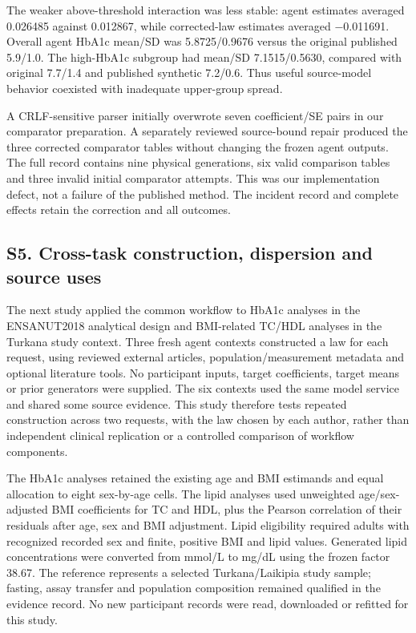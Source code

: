 \documentclass[10pt,twocolumn]{article}
\begin{document}
The weaker above-threshold interaction was less stable: agent estimates averaged 0.026485 against 0.012867, while corrected-law estimates averaged −0.011691. Overall agent HbA1c mean/SD was 5.8725/0.9676 versus the original published 5.9/1.0. The high-HbA1c subgroup had mean/SD 7.1515/0.5630, compared with original 7.7/1.4 and published synthetic 7.2/0.6. Thus useful source-model behavior coexisted with inadequate upper-group spread.


A CRLF-sensitive parser initially overwrote seven coefficient/SE pairs in our comparator preparation. A separately reviewed source-bound repair produced the three corrected comparator tables without changing the frozen agent outputs. The full record contains nine physical generations, six valid comparison tables and three invalid initial comparator attempts. This was our implementation defect, not a failure of the published method. The incident record and complete effects retain the correction and all outcomes.


\subsection*{S5. Cross-task construction, dispersion and source uses}

The next study applied the common workflow to HbA1c analyses in the ENSANUT2018 analytical design and BMI-related TC/HDL analyses in the Turkana study context. Three fresh agent contexts constructed a law for each request, using reviewed external articles, population/measurement metadata and optional literature tools. No participant inputs, target coefficients, target means or prior generators were supplied. The six contexts used the same model service and shared some source evidence. This study therefore tests repeated construction across two requests, with the law chosen by each author, rather than independent clinical replication or a controlled comparison of workflow components.


The HbA1c analyses retained the existing age and BMI estimands and equal allocation to eight sex-by-age cells. The lipid analyses used unweighted age/sex-adjusted BMI coefficients for TC and HDL, plus the Pearson correlation of their residuals after age, sex and BMI adjustment. Lipid eligibility required adults with recognized recorded sex and finite, positive BMI and lipid values. Generated lipid concentrations were converted from mmol/L to mg/dL using the frozen factor 38.67. The reference represents a selected Turkana/Laikipia study sample; fasting, assay transfer and population composition remained qualified in the evidence record. No new participant records were read, downloaded or refitted for this study.
\end{document}
